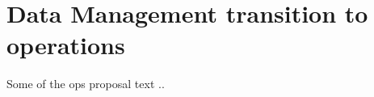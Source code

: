 


\section{ Data Management transition to operations} \label{sec:trans}
Some of the ops proposal text ..
